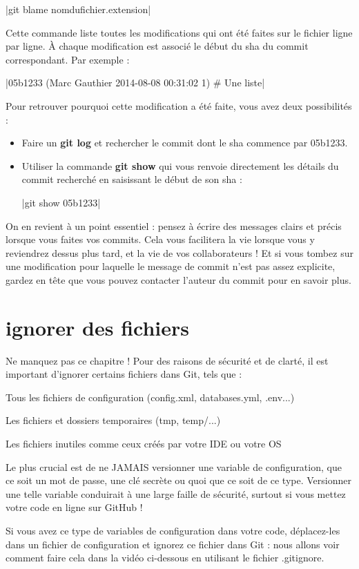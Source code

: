 |git blame nomdufichier.extension|

Cette commande liste toutes les modifications qui ont été faites sur le fichier ligne par ligne. À chaque modification est associé le début du sha du commit correspondant. Par exemple : 

|05b1233 (Marc Gauthier 2014-08-08 00:31:02 1) \# Une liste|

Pour retrouver pourquoi cette modification a été faite, vous avez deux possibilités : 
\begin{itemize}
\item Faire un \textbf{git log} et rechercher le commit dont le sha commence par 05b1233. 
\item Utiliser la commande \textbf{git show} qui vous renvoie directement les détails du commit recherché en saisissant le début de son sha : 

|git show 05b1233|
\end{itemize}

On en revient à un point essentiel : pensez à écrire des messages clairs et précis lorsque vous faites vos commits. Cela vous facilitera la vie lorsque vous y reviendrez dessus plus tard, et la vie de vos collaborateurs ! Et si vous tombez sur une modification pour laquelle le message de commit n'est pas assez explicite, gardez en tête que vous pouvez contacter l'auteur du commit pour en savoir plus. 

\section{ignorer des fichiers}
Ne manquez pas ce chapitre ! Pour des raisons de sécurité et de clarté, il est important d'ignorer certains fichiers dans Git, tels que :

Tous les fichiers de configuration (config.xml, databases.yml, .env...)

Les fichiers et dossiers temporaires (tmp, temp/...)

Les fichiers inutiles comme ceux créés par votre IDE ou votre OS

Le plus crucial est de ne JAMAIS versionner une variable de configuration, que ce soit un mot de passe, une clé secrète ou quoi que ce soit de ce type. Versionner une telle variable conduirait à une large faille de sécurité, surtout si vous mettez votre code en ligne sur GitHub !

 

Si vous avez ce type de variables de configuration dans votre code, déplacez-les dans un fichier de configuration et ignorez ce fichier dans Git : nous allons voir comment faire cela dans la vidéo ci-dessous en utilisant le fichier .gitignore.

